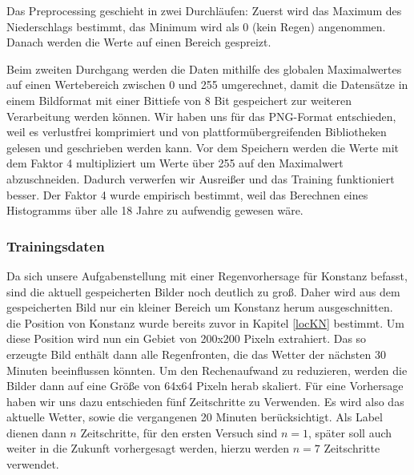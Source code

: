 Das Preprocessing geschieht in zwei Durchläufen: Zuerst wird das Maximum des Niederschlags bestimmt, das Minimum wird als 0 (kein Regen) angenommen. Danach werden die Werte auf einen Bereich gespreizt.

Beim zweiten Durchgang werden die Daten mithilfe des globalen Maximalwertes auf einen Wertebereich zwischen 0 und 255 umgerechnet, damit die Datensätze in einem Bildformat mit einer Bittiefe von 8 Bit gespeichert zur weiteren Verarbeitung werden können. Wir haben uns für das PNG-Format entschieden, weil es verlustfrei komprimiert und von platt­form­über­grei­fenden Bibliotheken gelesen und geschrieben werden kann.
Vor dem Speichern werden die Werte mit dem Faktor 4 multipliziert um Werte über 255 auf den Maximalwert abzuschneiden. Dadurch verwerfen wir Ausreißer und das Training funktioniert besser. Der Faktor 4 wurde empirisch bestimmt, weil das Berechnen eines Histogramms über alle 18 Jahre zu aufwendig gewesen wäre.

\subsubsection{Trainingsdaten}
\label{Samples}
Da sich unsere Aufgabenstellung mit einer Regenvorhersage für Konstanz befasst, sind die aktuell gespeicherten Bilder noch deutlich zu groß. Daher wird aus dem gespeicherten Bild nur ein kleiner Bereich um Konstanz herum ausgeschnitten. die Position von Konstanz wurde bereits zuvor in Kapitel \ref{locKN} bestimmt. Um diese Position wird nun ein Gebiet von 200x200 Pixeln extrahiert. Das so erzeugte Bild enthält dann alle Regenfronten, die das Wetter der nächsten 30 Minuten beeinflussen könnten. Um den Rechenaufwand zu reduzieren, werden die Bilder dann auf eine Größe von 64x64 Pixeln herab skaliert. Für eine Vorhersage haben wir uns dazu entschieden fünf Zeitschritte zu Verwenden. Es wird also das aktuelle Wetter, sowie die vergangenen 20 Minuten berücksichtigt.
Als Label dienen dann $n$ Zeitschritte, für den ersten Versuch sind $n = 1$, später soll auch weiter in die Zukunft vorhergesagt werden, hierzu werden $n = 7$ Zeitschritte verwendet.

